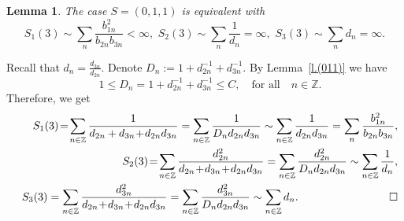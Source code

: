 \documentclass[preprint,12pt]{elsarticle}
\newtheorem{lem}[thm]{Lemma}
\numberwithin{equation}{section}
\begin{document}
\begin{lem}
\label{l.S_(123)} 
%
The case  $S=(0,1,1)$ is equivalent with
\begin{equation}
\label{S_(123)}
S_1(3)\!\sim\!\sum_n\frac{b_{1n}^2}{b_{2n}b_{3n}}\!<\!\infty,\,\,
S_2(3)\sim\sum_n\frac{1}{d_n}=\infty,
\,\,
S_3(3)\sim\sum_nd_n=\infty.
\end{equation}
\end{lem}
\begin{pf} 
Recall that $d_{n}\!=\!\frac{d_{3n}}{d_{2n}}$.
Denote $D_n:=1+d^{-1}_{2n}+d^{-1}_{3n}$.
%
By Lemma~\ref{l.(011)} we have
\begin{equation}
\label{alpha}
\quad 1\leq D_n=1+d^{-1}_{2n}+d^{-1}_{3n}\leq C,\quad \text{for all}\quad n\in\mathbb Z.
\end{equation}
%
Therefore, we get
\begin{eqnarray*}
 && S_1(3)\!=\!\sum_{n\in \mathbb Z}\frac{1}{d_{2n}+d_{3n}\!+\!d_{2n}d_{3n}}=
\sum_{n\in \mathbb Z}\frac{1}{D_nd_{2n}d_{3n}}\sim 
\sum_{n\in \mathbb Z}\frac{1}{d_{2n}d_{3n}}=\sum_n\frac{b_{1n}^2}{b_{2n}b_{3n}},
\\ 
% 
 &&
S_2(3)\!=\!\sum_{n\in \mathbb Z}\frac{d_{2n}^2}{d_{2n}\!+\!d_{3n}\!+\!d_{2n}d_{3n}}=
\sum_{n\in \mathbb Z}\frac{d_{2n}^2}{D_nd_{2n}d_{3n}}\sim\sum_{n\in \mathbb Z}\frac{1}{d_n}, \\
 && S_3(3)=\sum_{n\in \mathbb Z}\frac{d_{3n}^2}{d_{2n}\!+\!d_{3n}\!+\!d_{2n}d_{3n}}
=\sum_{n\in \mathbb Z}\frac{d_{3n}^2}{D_nd_{2n}d_{3n}}\sim \sum_{n\in \mathbb Z}d_n.
%
\hskip 2.9cm\Box
 \end{eqnarray*}
 \end{pf}
\end{document}
